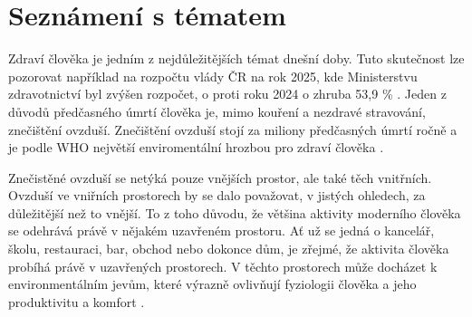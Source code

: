 \section*{Seznámení s tématem}
Zdraví člověka je jedním z nejdůležitějších témat dnešní doby. Tuto skutečnost lze pozorovat například na rozpočtu vlády ČR na rok 2025, kde Ministerstvu zdravotnictví byl zvýšen rozpočet, o proti roku 2024 o zhruba 53,9 \% \parencite{prcRozpocet2025}. Jeden z důvodů předčasného úmrtí člověka je, mimo kouření a nezdravé stravování, znečištění ovzduší. Znečištění ovzduší stojí za miliony předčasných úmrtí ročně a je podle WHO největší enviromentální hrozbou pro zdraví člověka \parencite{worldhealthorganizationWHOGlobalAir2021}. 

Znečistěné ovzduší se netýká pouze vnějších prostor, ale také těch vnitřních. Ovzduší ve vniřních prostorech by se dalo považovat, v jistých ohledech, za důležitější než to vnější. To z toho důvodu, že většina aktivity moderního člověka se odehrává právě v nějakém uzavřeném prostoru. Ať už se jedná o kancelář, školu, restauraci, bar, obchod nebo dokonce dům, je zřejmé, že aktivita člověka probíhá právě v uzavřených prostorech. V těchto prostorech může docházet k environmentálním jevům, které výrazně ovlivňují fyziologii člověka a jeho produktivitu a komfort \parencite{dengImpactIndoorAir2024}.